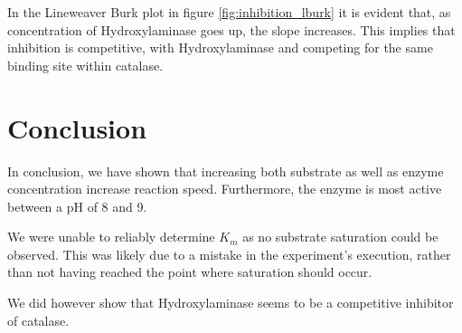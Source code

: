 \documentclass[a4paper,english]{scrreprt}
\begin{document}
In the Lineweaver Burk plot in figure \ref{fig:inhibition_lburk} it is evident
that, as concentration of Hydroxylaminase goes up, the slope increases. This
implies that inhibition is competitive, with Hydroxylaminase and 
competing for the same binding site within catalase.

\chapter{Conclusion}

In conclusion, we have shown that increasing both substrate as well as enzyme
concentration increase reaction speed. Furthermore, the enzyme is most active
between a pH of 8 and 9.

We were unable to reliably determine $K_m$ as no substrate saturation could be
observed. This was likely due to a mistake in the experiment's execution,
rather than not having reached the point where saturation should occur.

We did however show that Hydroxylaminase seems to be a competitive inhibitor of
catalase.



\end{document}

